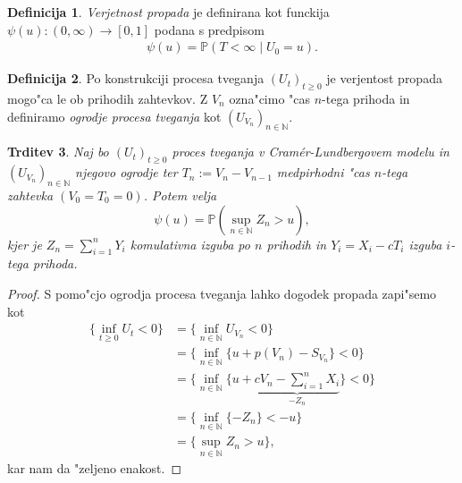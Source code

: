 \documentclass[12pt, a4paper, reqno]{amsart}
\theoremstyle{definition}
\newtheorem{definicija}{Definicija}[section]
\theoremstyle{plain}
\newtheorem{trditev}[definicija]{Trditev}
\newcommand{\N}{\mathbb{N}}
\newcommand{\Prob}{\mathbb{P}}
\newcommand{\1}{\mathds{1}}
\begin{document}
        \begin{definicija}
            \textit{Verjetnost propada} je definirana kot funckija $\psi(u): (0,\infty) \to [0,1]$ 
            podana s predpisom
            \begin{align*}
                \psi(u) = \Prob(T<\infty \mid U_0 = u).
            \end{align*}
            \label{def:VerjetnostPropada}
        \end{definicija}

        \begin{definicija}
            Po konstrukciji procesa tveganja $(U_t)_{t\geq0}$ je verjentost propada mogo"ca le ob 
            prihodih zahtevkov. %
            Z $V_n$ ozna"cimo "cas $n$-tega prihoda in definiramo 
            \textit{ogrodje procesa tveganja} kot $(U_{V_n})_{n\in\N}$.
            \label{def:ogrodjeProcesaTveganja}
        \end{definicija}

        \begin{trditev}
            Naj bo $(U_t)_{t\geq0}$ proces tveganja v Cramér-Lundbergovem modelu in $(U_{V_n})_{n\in\N}$ 
            njegovo ogrodje ter $T_n := V_n - V_{n-1}$ medpirhodni "cas $n$-tega zahtevka 
            $(V_0 = T_0 = 0)$. Potem velja 
            \begin{equation*}
                \psi(u) = \Prob\left(\sup_{n\in\N}Z_n > u\right),
            \end{equation*}
            kjer je $Z_n = \sum_{i=1}^nY_i$  komulativna izguba po $n$ prihodih in $Y_i = X_i - cT_i$
            izguba $i$-tega prihoda.
            \label{trd:verjetnostPropadaZOgrodjem}
        \end{trditev}

        \begin{proof}

            S pomo"cjo ogrodja procesa tveganja lahko dogodek propada zapi"semo kot
            \begin{align*}
                \biggl\{\inf_{t\geq0}U_t<0\biggr\} &= \biggl\{\inf_{n\in\N}U_{V_n}<0\biggr\} \\
                              &= \biggl\{\inf_{n\in\N}\bigl\{u + p(V_n) - S_{V_n}\bigr\} < 0\biggr\} \\
                              &= \biggl\{\inf_{n\in\N}\biggl\{u + 
                              \underbrace{cV_n - \sum_{i=1}^nX_i}_{-Z_n}\biggr\} < 0\biggr\} \\
                              &= \biggl\{\inf_{n\in\N}\{-Z_n\} < -u\biggr\} \\
                              &= \biggl\{\sup_{n\in\N}Z_n > u\biggr\},
            \end{align*}
            kar nam da "zeljeno enakost.
        \end{proof}
\end{document}
